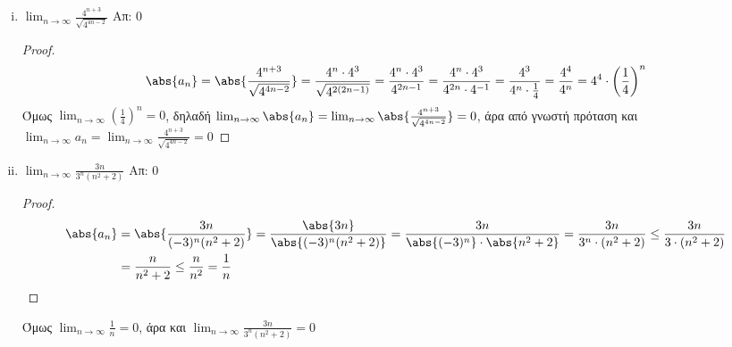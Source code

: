 \begin{enumerate}
\begin{enumerate}[i)]
            \item $ \lim_{n \to \infty} \frac{4^{n+3}}{\sqrt{4^{4n-2}}} $ \hfill Απ: 0  
                \begin{proof}
                    \[
                        \abs{a_{n}} = \abs{\frac{4^{n+3}}{\sqrt{4^{4n-2}}}} = 
                        \frac{4^{n}\cdot 4^{3}}{\sqrt{4^{2(2n-1)}}} = 
                        \frac{4^{n} \cdot 4^{3}}{4^{2n-1}} = 
                        \frac{4^{n}\cdot 4^{3}}{4^{2n}\cdot 4^{-1}} = 
                        \frac{4^{3}}{4^{n}\cdot 
                        \frac{1}{4}} = \frac{4^{4}}{4^{n}} = 4^{4}\cdot 
                        \left(\frac{1}{4} \right) ^{n}
                    \] 
                    Όμως $ \lim_{n \to \infty} \left(\frac{1}{4}\right)^{n} = 0  $, 
                    δηλαδή $ \lim_{n \to \infty} \abs{a_{n}} = \lim_{n \to \infty}
                    \abs{\frac{4^{n+3}}{\sqrt{4^{4n-2}}}} = 0 $, άρα από γνωστή 
                    πρόταση και $ \lim_{n \to \infty} a_{n} =  \lim_{n \to \infty} 
                    \frac{4^{n+3}}{\sqrt{4^{4n-2}}} = 0 $ 
                \end{proof}

            \item $ \lim_{n \to \infty} \frac{3n}{3^{n}(n^{2}+2)} $ \hfill Απ: 0  
                \begin{proof}
                    \begin{align*}
                        \abs{a_{n}} 
               &= \abs{\frac{3n}{(-3)^{n}(n^{2}+2)}} =
               \frac{\abs{3n}}{\abs{(-3)^{n}(n^{2}+2)}} = \frac{3n}{\abs{(-3)^{n}} \cdot
               \abs{n^{2}+2} } = \frac{3n}{3^{n}\cdot (n^{2}+2)} \leq 
               \frac{3n}{3\cdot (n^{2}+2)} \\ 
               &= \frac{n}{n^{2}+2} \leq \frac{n}{n^{2}} = \frac{1}{n} 
                    \end{align*} 
                \end{proof}
                Όμως $ \lim_{n \to \infty} \frac{1}{n} = 0 $, άρα και 
                $ \lim_{n \to \infty} \frac{3n}{3^{n}(n^{2}+2)} = 0 $
        \end{enumerate}
\end{enumerate}






